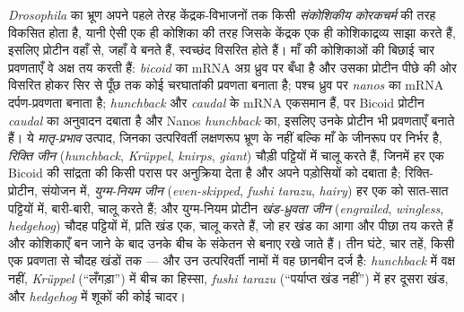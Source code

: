 \begin{definition}[खंडन-पदानुक्रमी]\label{def:b3:developmental-genetics:hierarchy}
\emph{Drosophila} का भ्रूण अपने पहले तेरह केंद्रक-विभाजनों तक किसी
\emph{संकोशिकीय कोरकचर्म} की तरह विकसित होता है, यानी ऐसी एक ही कोशिका
की तरह जिसके केंद्रक एक ही कोशिकाद्रव्य साझा करते हैं, इसलिए प्रोटीन
वहाँ से, जहाँ वे बनते हैं, स्वच्छंद विसरित होते हैं। माँ की कोशिकाओं की
बिछाई चार प्रवणताएँ वे अक्ष तय करती हैं: \emph{bicoid} का mRNA अग्र
ध्रुव पर बँधा है और उसका प्रोटीन पीछे की ओर विसरित होकर सिर से पूँछ तक
कोई चरघातांकी प्रवणता बनाता है; पश्च ध्रुव पर \emph{nanos} का mRNA
दर्पण-प्रवणता बनाता है; \emph{hunchback} और \emph{caudal} के mRNA
एकसमान हैं, पर Bicoid प्रोटीन \emph{caudal} का अनुवादन दबाता है और
Nanos \emph{hunchback} का, इसलिए उनके प्रोटीन भी प्रवणताएँ बनाते हैं।
ये \emph{मातृ-प्रभाव} उत्पाद, जिनका उत्परिवर्ती लक्षणरूप भ्रूण के नहीं
बल्कि माँ के जीनरूप पर निर्भर है, \emph{रिक्ति जीन}
(\emph{hunchback}, \emph{Krüppel}, \emph{knirps}, \emph{giant}) चौड़ी
पट्टियों में चालू करते हैं, जिनमें हर एक Bicoid की सांद्रता की किसी
परास पर अनुक्रिया देता है और अपने पड़ोसियों को दबाता है; रिक्ति-प्रोटीन,
संयोजन में, \emph{युग्म-नियम जीन} (\emph{even-skipped}, \emph{fushi
tarazu}, \emph{hairy}) हर एक को सात-सात पट्टियों में, बारी-बारी, चालू
करते हैं; और युग्म-नियम प्रोटीन \emph{खंड-ध्रुवता जीन}
(\emph{engrailed}, \emph{wingless}, \emph{hedgehog}) चौदह पट्टियों में,
प्रति खंड एक, चालू करते हैं, जो हर खंड का आगा और पीछा तय करते हैं और
कोशिकाएँ बन जाने के बाद उनके बीच के संकेतन से बनाए रखे जाते हैं। तीन
घंटे, चार तहें, किसी एक प्रवणता से चौदह खंडों तक --- और उन उत्परिवर्ती
नामों में वह छानबीन दर्ज है: \emph{hunchback} में वक्ष नहीं,
\emph{Krüppel} (``लँगड़ा'') में बीच का हिस्सा, \emph{fushi tarazu}
(``पर्याप्त खंड नहीं'') में हर दूसरा खंड, और \emph{hedgehog} में
शूकों की कोई चादर।
\end{definition}

